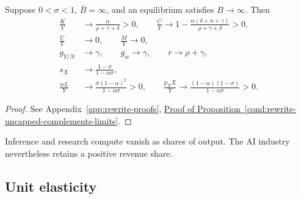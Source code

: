 \begin{proposition}
\label{cond:rewrite-uncapped-complements-limits}
Suppose $0<\sigma<1$, $\overline B=\infty$, and an equilibrium satisfies
$B\to\infty$. Then
\begin{align}
 \frac KY&\to\frac{\alpha}{\rho+\gamma+\delta}>0,\qquad
 \frac CY\to1-\frac{\alpha(\delta+n+\gamma)}{\rho+\gamma+\delta}>0,
 \label{eq:rewrite-uncapped-complements-allocation-ratios}\\
 \frac UY&\to0,\qquad \frac MY\to0,
 \label{eq:rewrite-uncapped-complements-compute-shares}\\
 g_{Y/N}&\to\gamma,\qquad g_w\to\gamma,\qquad r\to\rho+\gamma,
 \label{eq:rewrite-uncapped-complements-rates}\\
 s_X&\to\frac{1-\sigma}{1-\alpha\sigma},
 \label{eq:rewrite-uncapped-complements-sx}\\
 \frac{wL}{Y}&\to\frac{\sigma(1-\alpha)^2}{1-\alpha\sigma}>0,
 \qquad
 \frac{p_XX}{Y}\to\frac{(1-\alpha)(1-\sigma)}{1-\alpha\sigma}>0.
 \label{eq:rewrite-uncapped-complements-income}
\end{align}
\end{proposition}
\begin{proof}
See Appendix~\ref{app:rewrite-proofs},
\hyperref[proof:rewrite-uncapped-complements-limits]{Proof of
Proposition~\ref*{cond:rewrite-uncapped-complements-limits}}.
\end{proof}

Inference and research compute vanish as shares of output. The AI industry nevertheless retains a positive revenue share.


\subsection{Unit elasticity}
\label{subsec:rewrite-uncapped-unit-bgp}

